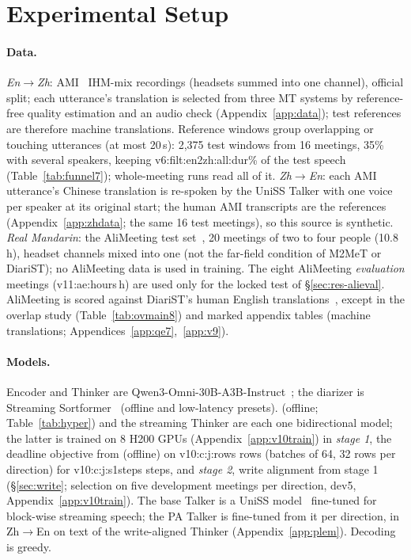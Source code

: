 \section{Experimental Setup}
\label{sec:setup}

\paragraph{Data.} \emph{En$\rightarrow$Zh}: AMI~\citep{carletta2005ami} IHM-mix recordings (headsets summed into one
channel), official split; each utterance's translation is selected from three MT systems by reference-free quality
estimation and an audio check (Appendix~\ref{app:data}); test references are therefore machine translations. Reference
windows group overlapping or touching utterances (at most 20\,s): 2{,}375 test windows from 16 meetings, 35\% with
several speakers, keeping \num{v6:filt:en2zh:all:dur}\% of the test speech (Table~\ref{tab:funnel7}); whole-meeting runs
read all of it. \emph{Zh$\rightarrow$En}: each AMI utterance's Chinese translation is re-spoken by the UniSS Talker with
one voice per speaker at its original start; the human AMI transcripts are the references (Appendix~\ref{app:zhdata};
the same 16 test meetings), so this source is synthetic. \emph{Real Mandarin}: the AliMeeting test set~\citep{yu2022m2met}, 20
meetings of two to four people (10.8\,h), headset channels mixed into one (not the far-field condition of M2MeT or
DiariST); no AliMeeting data is used in training.\ifAliEval{} The eight AliMeeting \emph{evaluation} meetings
(\num{v11:ae:hours}\,h) are used only for the locked test of \S\ref{sec:res-alieval}.\fi{} AliMeeting is scored
against DiariST's human English translations~\citep{yang2024diarist}, except in the overlap study
(Table~\ref{tab:ovmain8}) and marked appendix tables (machine translations; Appendices~\ref{app:qe7},~\ref{app:v9}).

\paragraph{Models.} Encoder and Thinker are Qwen3-Omni-30B-A3B-Instruct~\citep{xu2025qwen3omni}; the diarizer is
Streaming Sortformer~\citep{medennikov2025streaming} (offline and low-latency presets). \sys{} (offline;
Table~\ref{tab:hyper}) and the streaming Thinker are each one bidirectional model; the latter is trained on 8 H200 GPUs
(Appendix~\ref{app:v10train}) in \emph{stage 1}, the deadline objective from \sys{} (offline) on \num{v10:c:j:rows}
rows (batches of 64, 32 rows per direction) for \num{v10:c:j:s1steps} steps, and \emph{stage 2}, write alignment from
stage 1 (\S\ref{sec:write}; selection on five development meetings per direction, dev5, Appendix~\ref{app:v10train}). The base Talker is a UniSS model~\citep{uniss2025} fine-tuned for block-wise
streaming speech; the PA Talker is fine-tuned from it per direction, in Zh$\rightarrow$En on text of the write-aligned Thinker
(Appendix~\ref{app:plem}). Decoding is greedy.

